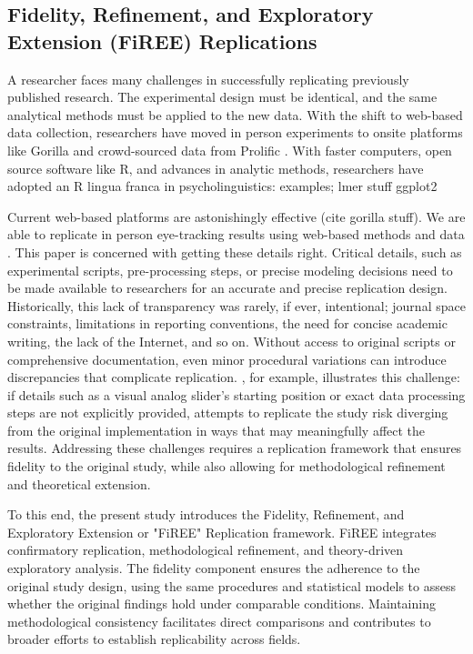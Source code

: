\subsection{Fidelity, Refinement, and Exploratory Extension (FiREE) Replications}

A researcher faces many challenges in successfully replicating previously published research. The experimental design must be identical, and the same analytical methods must be applied to the new data. With the shift to web-based data collection, researchers have moved in person experiments to onsite platforms like Gorilla \cite{Anwyl-Irvine_2019} and crowd-sourced data from Prolific \cite{}. With faster computers, open source software like R, and advances in analytic methods, researchers have adopted an R lingua franca in psycholinguistics: examples; lmer stuff ggplot2 

Current web-based platforms are astonishingly effective (cite gorilla stuff). We are able to replicate in person eye-tracking results using web-based methods and data \citep[see ][] {AOW, Vos_2022}. This paper is concerned with getting these details right. Critical details, such as experimental scripts, pre-processing steps, or precise modeling decisions need to be made available to researchers for an accurate and precise replication design. Historically, this lack of transparency was rarely, if ever, intentional; journal space constraints, limitations in reporting conventions, the need for concise academic writing, the lack of the Internet, and so on. Without access to original scripts or comprehensive documentation, even minor procedural variations can introduce discrepancies that complicate replication. \cite{AOW}, for example, illustrates this challenge: if details such as a visual analog slider's starting position or exact data processing steps are not explicitly provided, attempts to replicate the study risk diverging from the original implementation in ways that may meaningfully affect the results. Addressing these challenges requires a replication framework that ensures fidelity to the original study, while also allowing for methodological refinement and theoretical extension.

To this end, the present study introduces the Fidelity, Refinement, and Exploratory Extension or "FiREE" Replication framework. FiREE integrates confirmatory replication, methodological refinement, and theory-driven exploratory analysis. The fidelity component ensures the adherence to the original study design, using the same procedures and statistical models to assess whether the original findings hold under comparable conditions. Maintaining methodological consistency facilitates direct comparisons and contributes to broader efforts to establish replicability across fields. 

